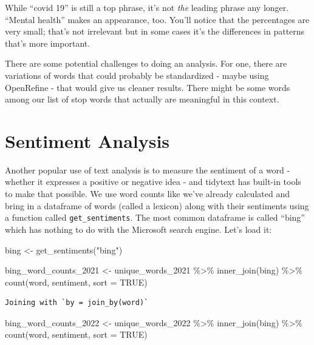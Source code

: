 \documentclass[
  letterpaper,
  DIV=11,
  numbers=noendperiod]{scrreprt}
\newenvironment{Shaded}{\begin{snugshade}}{\end{snugshade}}
\newcommand{\AttributeTok}[1]{\textcolor[rgb]{0.40,0.45,0.13}{#1}}
\newcommand{\ConstantTok}[1]{\textcolor[rgb]{0.56,0.35,0.01}{#1}}
\newcommand{\FunctionTok}[1]{\textcolor[rgb]{0.28,0.35,0.67}{#1}}
\newcommand{\NormalTok}[1]{\textcolor[rgb]{0.00,0.23,0.31}{#1}}
\newcommand{\OtherTok}[1]{\textcolor[rgb]{0.00,0.23,0.31}{#1}}
\newcommand{\SpecialCharTok}[1]{\textcolor[rgb]{0.37,0.37,0.37}{#1}}
\newcommand{\StringTok}[1]{\textcolor[rgb]{0.13,0.47,0.30}{#1}}
\begin{document}
While ``covid 19'' is still a top phrase, it's not \emph{the} leading
phrase any longer. ``Mental health'' makes an appearance, too. You'll
notice that the percentages are very small; that's not irrelevant but in
some cases it's the differences in patterns that's more important.

There are some potential challenges to doing an analysis. For one, there
are variations of words that could probably be standardized - maybe
using OpenRefine - that would give us cleaner results. There might be
some words among our list of stop words that actually are meaningful in
this context.

\hypertarget{sentiment-analysis}{%
\section{Sentiment Analysis}\label{sentiment-analysis}}

Another popular use of text analysis is to measure the sentiment of a
word - whether it expresses a positive or negative idea - and tidytext
has built-in tools to make that possible. We use word counts like we've
already calculated and bring in a dataframe of words (called a lexicon)
along with their sentiments using a function called
\texttt{get\_sentiments}. The most common dataframe is called ``bing''
which has nothing to do with the Microsoft search engine. Let's load it:

\begin{Shaded}
\begin{Highlighting}[]
\NormalTok{bing }\OtherTok{\textless{}{-}} \FunctionTok{get\_sentiments}\NormalTok{(}\StringTok{"bing"}\NormalTok{)}

\NormalTok{bing\_word\_counts\_2021 }\OtherTok{\textless{}{-}}\NormalTok{ unique\_words\_2021 }\SpecialCharTok{\%\textgreater{}\%}
  \FunctionTok{inner\_join}\NormalTok{(bing) }\SpecialCharTok{\%\textgreater{}\%}
  \FunctionTok{count}\NormalTok{(word, sentiment, }\AttributeTok{sort =} \ConstantTok{TRUE}\NormalTok{)}
\end{Highlighting}
\end{Shaded}

\begin{verbatim}
Joining with `by = join_by(word)`
\end{verbatim}

\begin{Shaded}
\begin{Highlighting}[]
\NormalTok{bing\_word\_counts\_2022 }\OtherTok{\textless{}{-}}\NormalTok{ unique\_words\_2022 }\SpecialCharTok{\%\textgreater{}\%}
  \FunctionTok{inner\_join}\NormalTok{(bing) }\SpecialCharTok{\%\textgreater{}\%}
  \FunctionTok{count}\NormalTok{(word, sentiment, }\AttributeTok{sort =} \ConstantTok{TRUE}\NormalTok{)}
\end{Highlighting}
\end{Shaded}
\end{document}
